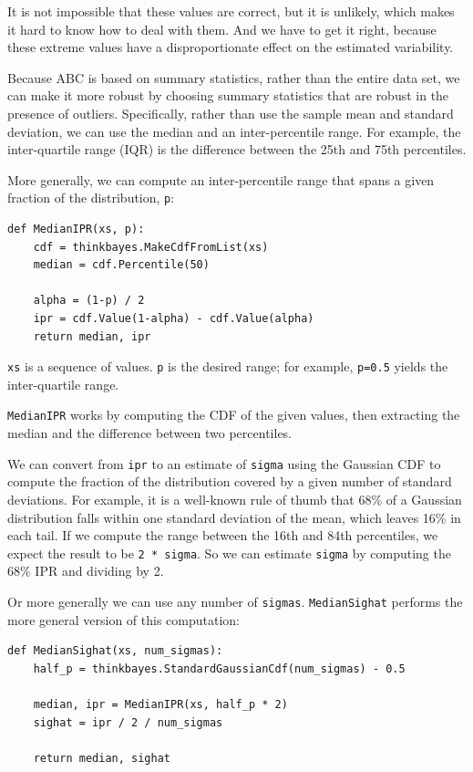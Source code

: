 \documentclass[12pt]{book}
\begin{document}
It is not impossible that these values are correct, but it is
unlikely, which makes it hard to know how to deal with them.
And we have to get
it right, because these extreme values have a disproportionate
effect on the estimated variability.

Because ABC is based on summary statistics, rather than the entire
data set, we can make it more robust by choosing summary statistics
that are robust in the presence of outliers.  Specifically, rather
than use the sample mean and standard deviation, we can use the median
and an inter-percentile range.  For example, the inter-quartile range
(IQR) is the difference between the 25th and 75th percentiles.

More generally, we can compute an inter-percentile range that
spans a given fraction of the distribution, {\tt p}:

\begin{verbatim}
def MedianIPR(xs, p):
    cdf = thinkbayes.MakeCdfFromList(xs)
    median = cdf.Percentile(50)

    alpha = (1-p) / 2
    ipr = cdf.Value(1-alpha) - cdf.Value(alpha)
    return median, ipr
\end{verbatim}

{\tt xs} is a sequence of values.  {\tt p} is the desired range;
for example, {\tt p=0.5} yields the inter-quartile range.

{\tt MedianIPR} works by computing the CDF of the given values,
then extracting the median and the difference between two
percentiles.

We can convert from {\tt ipr} to an estimate of {\tt sigma} using the
Gaussian CDF to compute the fraction of the distribution covered by a
given number of standard deviations.  For example, it is a well-known
rule of thumb that 68\% of a Gaussian distribution falls within one
standard deviation of the mean, which leaves 16\% in each tail.  If we
compute the range between the 16th and 84th percentiles, we expect the
result to be {\tt 2 * sigma}.  So we can estimate {\tt sigma} by
computing the 68\% IPR and dividing by 2.

Or more generally we can use any number of {\tt sigmas}.
{\tt MedianSighat} performs the more general version of this
computation:

\begin{verbatim}
def MedianSighat(xs, num_sigmas):
    half_p = thinkbayes.StandardGaussianCdf(num_sigmas) - 0.5

    median, ipr = MedianIPR(xs, half_p * 2)
    sighat = ipr / 2 / num_sigmas

    return median, sighat
\end{verbatim}
\end{document}
